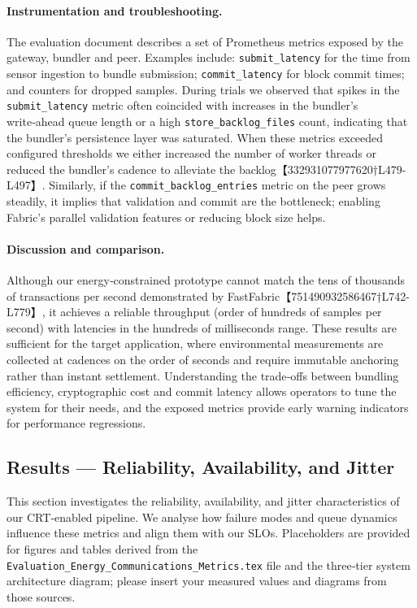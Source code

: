\documentclass[12pt,onecolumn]{IEEEtran} %
\begin{document}
\paragraph{Instrumentation and troubleshooting.}  The evaluation document
\citep{evaluation_metrics_doc} describes a set of Prometheus metrics exposed
by the gateway, bundler and peer.  Examples include: \texttt{submit\_latency}
for the time from sensor ingestion to bundle submission; \texttt{commit\_latency}
for block commit times; and counters for dropped samples.  During trials we
observed that spikes in the \texttt{submit\_latency} metric often coincided
with increases in the bundler’s write‑ahead queue length or a high
\texttt{store\_backlog\_files} count, indicating that the bundler’s persistence
layer was saturated.  When these metrics exceeded configured thresholds we
either increased the number of worker threads or reduced the bundler’s cadence
to alleviate the backlog【332931077977620†L479-L497】.  Similarly, if the
\texttt{commit\_backlog\_entries} metric on the peer grows steadily,
it implies that validation and commit are the bottleneck; enabling Fabric’s
parallel validation features or reducing block size helps.

\paragraph{Discussion and comparison.}  Although our energy‑constrained
prototype cannot match the tens of thousands of transactions per second
demonstrated by FastFabric【751490932586467†L742-L779】, it achieves a reliable
throughput (order of hundreds of samples per second) with latencies in the
hundreds of milliseconds range.  These results are sufficient for the target
application, where environmental measurements are collected at cadences on the
order of seconds and require immutable anchoring rather than instant settlement.
Understanding the trade‑offs between bundling efficiency, cryptographic cost and
commit latency allows operators to tune the system for their needs, and the
exposed metrics provide early warning indicators for performance regressions.


\subsection{Results — Reliability, Availability, and Jitter}
\label{sec:rel-avail-jitter}
This section investigates the reliability, availability, and jitter characteristics of our CRT‑enabled pipeline.  We analyse how failure modes and queue dynamics influence these metrics and align them with our SLOs.  Placeholders are provided for figures and tables derived from the \texttt{Evaluation\_Energy\_Communications\_Metrics.tex} file and the three‑tier system architecture diagram; please insert your measured values and diagrams from those sources.
\end{document}
